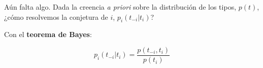 \documentclass[12pt]{article}
\begin{document}
Aún falta algo. Dada la creencia \textit{a priori} sobre la distribución de los tipos, $p(t)$, ¿cómo resolvemos la conjetura de $i$, $p_i(t_{-i}|t_i)$?

Con el \textbf{teorema de Bayes}:

\[ p_i(t_{-i}|t_i) = \frac{p(t_{-i}, t_i)}{p(t_i)} \]











\end{document}

